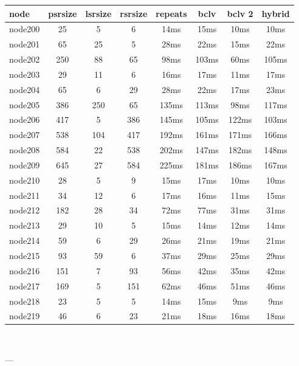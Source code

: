 \begin{tabular}{|l|c|c|c|c|c|c|c|}
\hline node & psrsize & lsrsize & rsrsize   & repeats & bclv & bclv 2 & hybrid\\
    \hline node200 & 25 & 5 & 6 & 14ms & 15ms & 10ms & 10ms\\
    \hline node201 & 65 & 25 & 5 & 28ms & 22ms & 15ms & 22ms\\
    \hline node202 & 250 & 88 & 65 & 98ms & 103ms & 60ms & 105ms\\
    \hline node203 & 29 & 11 & 6 & 16ms & 17ms & 11ms & 17ms\\
    \hline node204 & 65 & 6 & 29 & 28ms & 22ms & 17ms & 23ms\\
    \hline node205 & 386 & 250 & 65 & 135ms & 113ms & 98ms & 117ms\\
    \hline node206 & 417 & 5 & 386 & 145ms & 105ms & 122ms & 103ms\\
    \hline node207 & 538 & 104 & 417 & 192ms & 161ms & 171ms & 166ms\\
    \hline node208 & 584 & 22 & 538 & 202ms & 147ms & 182ms & 148ms\\
    \hline node209 & 645 & 27 & 584 & 225ms & 181ms & 186ms & 167ms\\
    \hline node210 & 28 & 5 & 9 & 15ms & 17ms & 10ms & 10ms\\
    \hline node211 & 34 & 12 & 6 & 17ms & 16ms & 11ms & 15ms\\
    \hline node212 & 182 & 28 & 34 & 72ms & 77ms & 31ms & 31ms\\
    \hline node213 & 29 & 10 & 5 & 15ms & 14ms & 12ms & 14ms\\
    \hline node214 & 59 & 6 & 29 & 26ms & 21ms & 19ms & 21ms\\
    \hline node215 & 93 & 59 & 6 & 37ms & 29ms & 25ms & 29ms\\
    \hline node216 & 151 & 7 & 93 & 56ms & 42ms & 35ms & 42ms\\
    \hline node217 & 169 & 5 & 151 & 62ms & 46ms & 51ms & 46ms\\
    \hline node218 & 23 & 5 & 5 & 14ms & 15ms & 9ms & 9ms\\
    \hline node219 & 46 & 6 & 23 & 21ms & 18ms & 16ms & 18ms\\

\hline
\end{tabular} \

---


